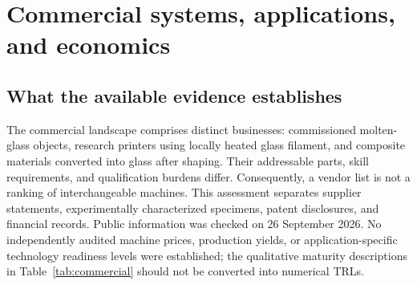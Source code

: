 \section{Commercial systems, applications, and economics}
\label{sec:commercial}

\subsection{What the available evidence establishes}
The commercial landscape comprises distinct businesses: commissioned molten-glass objects, research printers using locally heated glass filament, and composite materials converted into glass after shaping. Their addressable parts, skill requirements, and qualification burdens differ. Consequently, a vendor list is not a ranking of interchangeable machines. This assessment separates supplier statements, experimentally characterized specimens, patent disclosures, and financial records. Public information was checked on 26 September 2026. No independently audited machine prices, production yields, or application-specific technology readiness levels were established; the qualitative maturity descriptions in Table~\ref{tab:commercial} should not be converted into numerical TRLs.

